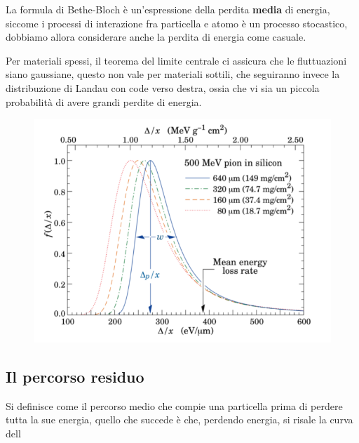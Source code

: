 \begin{tcolorbox}[colback=red!5!white,colframe=red!50!black,title=ATTENZIONE !]
        La formula di Bethe-Bloch è un'espressione della perdita \textbf{media} di energia, siccome i processi di interazione
        fra particella e atomo è un processo stocastico, dobbiamo allora considerare anche la perdita di energia come casuale.
\end{tcolorbox}
\newpage
Per materiali spessi, il teorema del limite centrale ci assicura che le fluttuazioni siano gaussiane, questo non vale 
per materiali sottili, che seguiranno invece la distribuzione di Landau con code verso destra, ossia che vi sia un piccola 
probabilità di avere grandi perdite di energia.
\begin{figure}[!h]
    \centering
    \includegraphics[scale=0.5]{ch6InterazioneMateria/Landau}
\end{figure}
\subsection{Il percorso residuo}
Si definisce come il percorso medio che compie una particella prima di perdere tutta la sue energia, quello che succede è che, 
perdendo energia, si risale la curva dell
